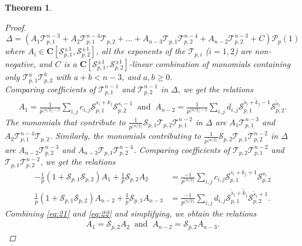 \documentclass{amsart}%
\theoremstyle{plain}
\newtheorem{thm}{Theorem}[subsection]
\theoremstyle{plain}
\theoremstyle{remark}
\begin{document}
\begin{thm}
\begin{proof}
        $$\Delta=\left(A_1\mathcal{T}_{p,1}^{n-3}+A_2\mathcal{T}_{p,1}^{n-4}\mathcal{T}_{p,2}+\dots +A_{n-3}\mathcal{T}_{p,1}\mathcal{T}_{p,2}^{n-4}+A_{n-2}\mathcal{T}_{p,2}^{n-3}+C\right)\mathcal{P}_p(1)$$
        where $A_i\in\mathbf{C}[\mathcal{S}_{p,1}^{\pm 1},\mathcal{S}_{p,2}^{\pm 1}]$, all the exponents of the $\mathcal{T}_{p,i}$ ($i=1,2$) are non-negative, and $C$ is a  $\mathbf{C}[\mathcal{S}_{p,1}^{\pm 1},\mathcal{S}_{p,2}^{\pm 1}]$-linear combination of monomials containing only $\mathcal{T}_{p,1}^a\mathcal{T}_{p,2}^b$ with $a+b<n-3$, and $a,b\geq 0.$\\
        Comparing coefficients of $\mathcal{T}_{p,1}^{n-1}$ and $\mathcal{T}_{p,2}^{n-1}$ in $\Delta$, we get the relations
        \begin{align}\label{eq:21}
            A_1=\frac{1}{p^{\lfloor n/2 \rfloor -1}}\sum_{i,j}c_{i,j}\mathcal{S}_{p,1}^{s_i+k_j}\mathcal{S}_{p,2}^{s_i-1}\ \text{ and }\ A_{n-2}=\frac{1}{p^{\lfloor n/2 \rfloor -1}}\sum_{i,j}d_{i,j}\mathcal{S}_{p,1}^{\tilde{s}_i+\tilde{k}_j-1}\mathcal{S}_{p,2}^{\tilde{s}_i}.
        \end{align}
        The monomials that contribute to $\frac{1}{p^{\lfloor n/2\rfloor}}\mathcal{S}_{p,1}\mathcal{T}_{p,2}\mathcal{T}_{p,1}^{n-2}$ in $\Delta$ are $A_1\mathcal{T}_{p,1}^{n-3}$ and $A_2\mathcal{T}_{p,1}^{n-4}\mathcal{T}_{p,2}$. Similarly, the monomials contributing to $\frac{1}{p^{\lfloor n/2\rfloor}}\mathcal{S}_{p,2}\mathcal{T}_{p,1}\mathcal{T}_{p,2}^{n-2}$ in $\Delta$ are $A_{n-2}\mathcal{T}_{p,2}^{n-3}$ and $A_{n-3}\mathcal{T}_{p,1}\mathcal{T}_{p,2}^{n-4}$. Comparing coefficients of $\mathcal{T}_{p,2}\mathcal{T}_{p,1}^{n-2}$ and $\mathcal{T}_{p,1}\mathcal{T}_{p,2}^{n-2}$, we get the relations 
        \begin{align}\label{eq:22}
            -\frac{1}{p}(1+\mathcal{S}_{p,1}\mathcal{S}_{p,2})A_1+\frac{1}{p}\mathcal{S}_{p,2}A_2&=\frac{-1}{p^{\lfloor n/2 \rfloor}}\sum_{i,j}c_{i,j}\mathcal{S}_{p,1}^{s_i+k_j+1}\mathcal{S}_{p,2}^{s_i}\\
            \nonumber \frac{1}{p}(1+\mathcal{S}_{p,1}\mathcal{S}_{p,2})A_{n-2}+\frac{1}{p}\mathcal{S}_{p,1}A_{n-3}&= \frac{-1}{p^{\lfloor n/2 \rfloor}}\sum_{i,j}d_{i,j}\mathcal{S}_{p,1}^{\tilde{s}_i+\tilde{k}_j}\mathcal{S}_{p,2}^{\tilde{s}_i+1}.
        \end{align}
        Combining \eqref{eq:21} and \eqref{eq:22} and simplifying, we obtain the relations
        \begin{align}\label{eq:24}
            A_1=\mathcal{S}_{p,2}A_2\ \text{ and }\ A_{n-2}=\mathcal{S}_{p,2}A_{n-3}.

\end{align}
\end{proof}
\end{thm}
\end{document}
